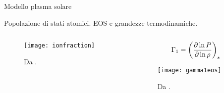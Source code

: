 \documentclass[10pt,xcolor={usenames},fleqn,mathserif,serif]{beamer}
\begin{document}
\begin{frame}{Modello plasma solare}

\begin{block}{Popolazione di stati atomici. EOS e grandezze termodinamiche.}

\begin{columns}

\begin{column}{0.5\textwidth}

\begin{figure}[!ht]
        \texttt{[image: ionfraction]}
        \caption{Da \cite{basu2008helioseismology}.}
\end{figure}%


\end{column}

\begin{column}{0.5\textwidth}

\[\Gamma_1=\left(\frac{\partial \ln{P}}{\partial \ln{\rho}}\right)_s\]

\begin{figure}[!ht]
        \texttt{[image: gamma1eos]}
        \caption{Da \cite{trampedach2006synoptic}.}
\end{figure}

\end{column}

\end{columns}

\end{block}

\end{frame}
\end{document}
